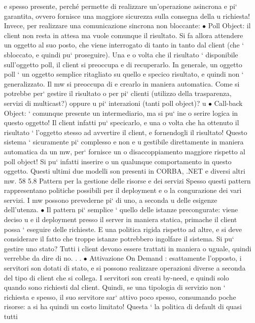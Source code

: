 \documentclass[a4paper,12pt]{article}
\begin{document}
e
spesso presente, perché permette di realizzare un'operazione asincrona
e
pi` garantita, ovvero fornisce una maggiore sicurezza sulla consegna della
u
richiesta!
Invece, per realizzare una comunicazione sincrona non bloccante:
$\bullet$ Poll Object: il client non resta in attesa ma vuole comunque il risultato.
Si fa allora attendere un oggetto al suo posto, che viene interrogato di
tanto in tanto dal client (che ` sbloccato, e quindi pu` proseguire). Una
e
o
volta che il risultato ` disponibile sull'oggetto poll, il client si preoccupa
e
di recuperarlo.
In generale, un oggetto poll ` un oggetto semplice ritagliato su quello
e
specico risultato, e quindi non ` generalizzato. Il mw si preoccupa di
e
crearlo in maniera automatica. Come si potrebbe per` gestire il risultato
o
per pi` clienti (utilizzo della trasparenza, servizi di multicast?) oppure
u
pi` interazioni (tanti poll object)?
u
$\bullet$ Call-back Object: ` comunque presente un intermediario, ma si pu` ine
o
serire logica in questo oggetto! Il client infatti pu` specicarlo, e una
o
volta che ha ottenuto il risultato ` l'oggetto stesso ad avvertire il client,
e
fornendogli il risultato! Questo sistema ` sicuramente pi` complesso e non
e
u
gestibile direttamente in maniera automatica da un mw, per` fornisce un
o
disaccoppiamento maggiore rispetto al poll object! Si pu` infatti inserire
o
un qualunque comportamento in questo oggetto.
Questi ultimi due modelli son presenti in CORBA, .NET e diversi altri mw.
58
5.8
Pattern per la gestione delle risorse e dei servizi
Spesso questi pattern rappresentano politiche possibili per il deployment e o la
congurazione dei vari servizi. I mw possono prevederne pi` di uno, a seconda
u
delle esigenze dell'utenza.
$\bullet$ Il pattern pi` semplice ` quello delle istanze precongurate: viene deciso
u
e
il deployment presso il server in maniera statica, primache il client possa
`
eseguire delle richieste. E una politica rigida rispetto ad altre, e si deve
considerare il fatto che troppe istanze potrebbero ingolfare il sistema. Si
pu` gestire uno stato? Tutti i client devono essere trattati in maniera
o
uguale, quindi verrebbe da dire di no. . .
$\bullet$ Attivazione On Demand : esattamente l'opposto, i servitori son dotati di
stato, e si possono realizzare operazioni diverse a seconda del tipo di client
che si collega. I servitori son creati by-need, e quindi solo quando sono
richiesti dal client. Quindi, se una tipologia di servizio non ` richiesta
e
spesso, il suo servitore sar` attivo poco spesso, consumando poche risorse:
a
si ha quindi un costo limitato! Questa ` la politica di default di quasi tutti
\end{document}
